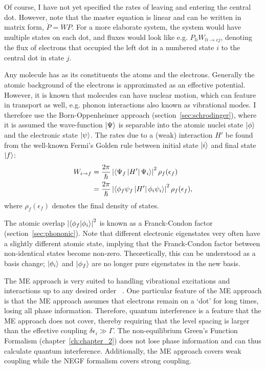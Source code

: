 Of course, I have not yet specified the rates of leaving and entering the central dot. However, note that the master equation is linear and can be written in matrix form, $\dot{P} = W P$. For a more elaborate system, the system would have multiple states on each dot, and fluxes would look like e.g. $P_{li} W_{li\rightarrow cj}$, denoting the flux of electrons that occupied the left dot in a numbered state $i$ to the central dot in state $j$.  

Any molecule has as its constituents the atoms and the electrons. Generally the atomic background of the electrons is approximated as an effective potential. However, it is known that molecules can have nuclear motion, which can feature in transport as well, e.g. phonon interactions also known as vibrational modes. I therefore use the Born-Oppenheimer approach (section~\ref{sec:schrodinger}), where it is assumed the wave-function $\ket{\Psi}$ is separable into the atomic nuclei state $\ket{\phi}$ and the electronic state $\ket{\psi}$. The rates due to a (weak) interaction $H'$ be found from the well-known Fermi's Golden rule between initial state $\ket{i}$ and final state $\ket{f}$:
\begin{align*}
W_{i\rightarrow f}  &= \frac{2\pi}{\hslash} \left| \braket{\Psi_f \left|H'\right| \Psi_i}\right|^2 \rho_f (\epsilon_f)  \\
&= \frac{2\pi}{\hslash} \left| \braket{\phi_f \psi_f \left|H'\right| \phi_i \psi_i}\right|^2 \rho_f (\epsilon_f),
\end{align*}
where $\rho_f(\epsilon_f)$ denotes the final density of states. 

The atomic overlap $\left| \braket{ \phi_f | \phi_i }\right|^2$ is known as a Franck-Condon factor (section~\ref{sec:phononic}). Note that different electronic eigenstates very often have a slightly different atomic state, implying that the Franck\hyp{}Condon factor between non-identical states become non-zero. Theoretically, this can be understood as a basis change; $\ket{\phi_i}$ and $\ket{\phi_f}$ are no longer pure eigenstates in the new basis. 

The ME approach is very suited to handling vibrational excitations and interactions up to any desired order ~\cite{seldenthuis}. One particular feature of the ME approach is that the ME approach assumes that electrons remain on a `dot' for long times, losing all phase information. Therefore, quantum interference is a feature that the ME approach does not cover, thereby requiring that the level spacing is larger than the effective coupling $\delta \epsilon_i \gg \Gamma$. The non-equilibrium Green's Function Formalism (chapter~\ref{ch:chapter_2})  does not lose phase information and can thus calculate quantum interference. Additionally, the ME approach covers weak coupling while the NEGF formalism covers strong coupling.

